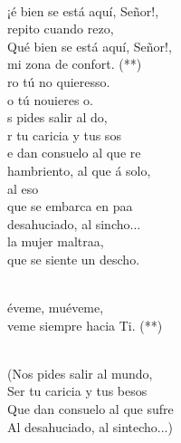 \begin{cancion}%
	  \\
	¡é bien se está aquí, Señor!, \\
	repito cuando rezo,\\
	Qué bien se está aquí, Señor!,\\
	mi zona de confort. (**)\\
\jump
	ro tú no quieresso.\\
	o tú nouieres o.\\
\jump
	s pides salir al do,\\
	r tu caricia y tus sos\\
	e dan consuelo al que re\\
	 hambriento, al que á solo, \\
	al eso\\
	 que se embarca en paa\\
	 desahuciado, al sincho...\\
	la mujer maltraa,\\
	 que se siente un descho.\\\jump\\
	\begin{chorus}%
	éveme, muéveme,\\
	veme siempre hacia Ti. (**) \\
	\end{chorus}%
	\jump\\
(Nos pides salir al mundo,\\
 Ser tu caricia y tus besos\\
 Que dan consuelo al que sufre\\
 Al desahuciado, al sintecho...)\\
\end{cancion}%
